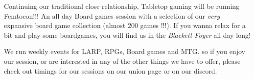 Continuing our traditional close relationship, Tabletop gaming will be running Femtocon!!! An all day Board games session with a selection of our \emph{very} expansive board game collection (almost 200 games !!!). If you wanna relax for a bit and play some boardgames, you will find us in the \emph{Blackett Foyer} all day long!

We run weekly events for LARP, RPGs, Board games and MTG. so if you enjoy our session, or are interested in any of the other things we have to offer, please check out timings for our sessions on our union page or on our discord.